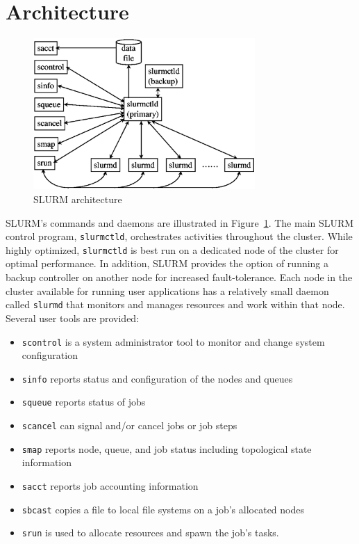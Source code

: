 \documentclass{../common/acm}
\begin{document}
\section{Architecture}

\begin{figure}[tb]
\centerline{\includegraphics[width=3.32in]{../figures/arch2.eps}}
\caption{\small SLURM architecture}
\label{arch}
\end{figure}

SLURM's commands and daemons are illustrated in Figure~\ref{arch}.
The main SLURM control program, {\tt slurmctld}, orchestrates
activities throughout the cluster. While highly optimized, 
{\tt slurmctld} is best run on a dedicated node of the cluster for optimal performance. 
In addition, SLURM provides the option of running  a backup controller 
on another node for increased fault-tolerance.
Each node in the cluster available for running user applications 
has a relatively small daemon called {\tt slurmd} that monitors
and manages resources and work within that node. 
Several user tools are provided:

\begin{itemize}
\item {\tt scontrol} is a system administrator tool to monitor and change
system configuration

\item {\tt sinfo} reports status and configuration of the nodes and queues

\item {\tt squeue} reports status of jobs

\item {\tt scancel} can signal and/or cancel jobs or job steps

\item {\tt smap} reports node, queue, and job status including 
topological state information

\item {\tt sacct} reports job accounting information

\item {\tt sbcast} copies a file to local file systems on a job's allocated nodes

\item {\tt srun} is used to allocate resources and spawn the job's tasks.
\end{itemize}
\end{document}

